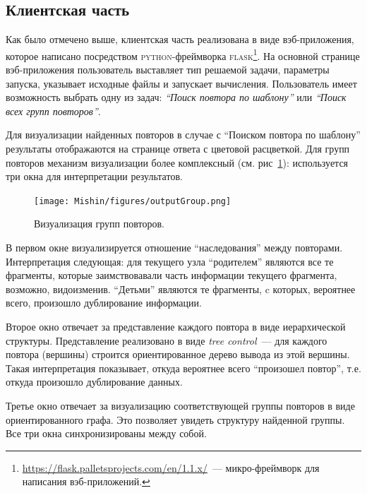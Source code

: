\subsection{Клиентская часть}\label{clinet}
Как было отмечено выше, клиентская часть реализована в виде вэб-приложения, которое написано посредством \textsc{python}-фреймворка \textsc{flask}\footnote{\url{https://flask.palletsprojects.com/en/1.1.x/}~--- микро-фреймворк для написания вэб-приложений.}.
На основной странице вэб-приложения пользователь выставляет тип решаемой задачи, параметры запуска, указывает исходные файлы и запускает вычисления.
Пользователь имеет возможность выбрать одну из задач: \emph{``Поиск повтора по шаблону''} или \emph{``Поиск всех групп повторов''}.

Для визуализации найденных повторов в случае с  ``Поиском повтора по шаблону'' результаты отображаются на странице ответа с цветовой расцветкой.
Для групп повторов механизм визуализации более комплексный (см. рис~\ref{fig:groupViz}): используется три окна для интерпретации результатов.

\begin{figure}[h!]
    \centering
    \texttt{[image: Mishin/figures/outputGroup.png]}
    \caption{Визуализация групп повторов.}\label{fig:groupViz}
\end{figure}

В первом окне визуализируется отношение ``наследования'' между повторами.
Интерпретация следующая: для текущего узла ``родителем'' являются все те фрагменты, которые заимствовавали часть информации текущего фрагмента, возможно, видоизменив.
``Детьми'' являются те фрагменты, c которых, вероятнее всего, произошло дублирование информации.

Второе окно отвечает за представление каждого повтора в виде иерархической структуры.
Представление реализовано в виде \emph{tree control}~--- для каждого повтора (вершины) строится ориентированное дерево вывода из этой вершины.
Такая интерпретация показывает, откуда вероятнее всего ``произошел повтор'', т.е. откуда произошло дублирование данных.

Третье окно отвечает за визуализацию соответствующей группы повторов в виде ориентированного графа.
Это позволяет увидеть структуру найденной группы.
Все три окна синхронизированы между собой.

